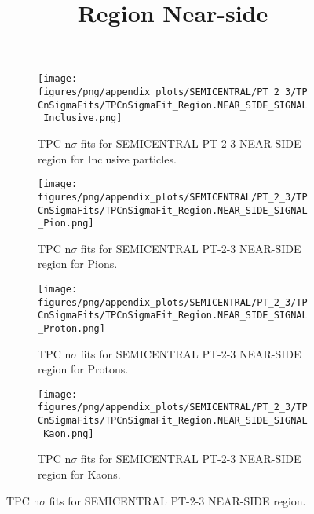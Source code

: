             \begin{figure}[H]
                \title{Region Near-side}
                \begin{subfigure}[b]{0.5\textwidth}
                    \centering
                    \texttt{[image: figures/png/appendix\_plots/SEMICENTRAL/PT\_2\_3/TPCnSigmaFits/TPCnSigmaFit\_Region.NEAR\_SIDE\_SIGNAL\_Inclusive.png]}
                    \caption{TPC n$\sigma$ fits for SEMICENTRAL PT-2-3 NEAR-SIDE region for Inclusive particles.}
                    \label{fig:appendix_SEMICENTRAL_PT-2-3_NEAR_SIDE_SIGNAL_Inclusive}
                \end{subfigure}
                \begin{subfigure}[b]{0.5\textwidth}
                    \centering
                    \texttt{[image: figures/png/appendix\_plots/SEMICENTRAL/PT\_2\_3/TPCnSigmaFits/TPCnSigmaFit\_Region.NEAR\_SIDE\_SIGNAL\_Pion.png]}
                    \caption{TPC n$\sigma$ fits for SEMICENTRAL PT-2-3 NEAR-SIDE region for Pions.}
                    \label{fig:appendix_SEMICENTRAL_PT-2-3_NEAR_SIDE_SIGNAL_Pion}
                \end{subfigure}
                \begin{subfigure}[b]{0.5\textwidth}
                    \centering
                    \texttt{[image: figures/png/appendix\_plots/SEMICENTRAL/PT\_2\_3/TPCnSigmaFits/TPCnSigmaFit\_Region.NEAR\_SIDE\_SIGNAL\_Proton.png]}
                    \caption{TPC n$\sigma$ fits for SEMICENTRAL PT-2-3 NEAR-SIDE region for Protons.}
                    \label{fig:appendix_SEMICENTRAL_PT-2-3_NEAR_SIDE_SIGNAL_Proton}
                \end{subfigure}
                \begin{subfigure}[b]{0.5\textwidth}
                    \centering
                    \texttt{[image: figures/png/appendix\_plots/SEMICENTRAL/PT\_2\_3/TPCnSigmaFits/TPCnSigmaFit\_Region.NEAR\_SIDE\_SIGNAL\_Kaon.png]}
                    \caption{TPC n$\sigma$ fits for SEMICENTRAL PT-2-3 NEAR-SIDE region for Kaons.}
                    \label{fig:appendix_SEMICENTRAL_PT-2-3_NEAR_SIDE_SIGNAL_Kaon}
                \end{subfigure}
                \caption{TPC n$\sigma$ fits for SEMICENTRAL PT-2-3 NEAR-SIDE region.}
                \label{fig:appendix_SEMICENTRAL_PT-2-3_NEAR_SIDE_SIGNAL}
            \end{figure}
